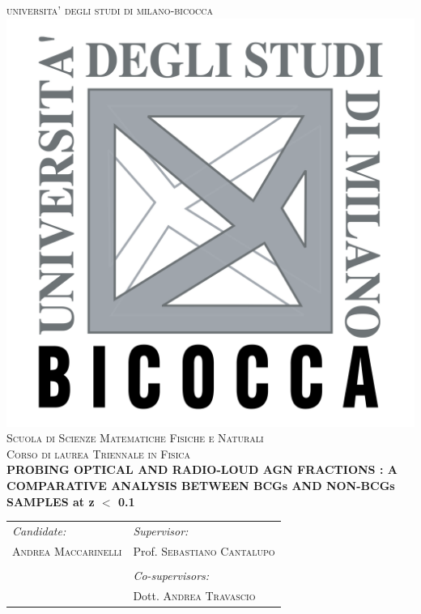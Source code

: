 \documentclass[a4]{article}
\newcommand{\HRule}{\rule{\linewidth}{0.5mm}} %
\begin{document}
\center %
 
{ 
\textsc{\LARGE universita' degli studi di milano-bicocca}\\[1cm] %
}
\includegraphics[width = .25\textwidth]{logo_unimib.png}\\[1cm] %
\textsc{ \large Scuola di Scienze Matematiche Fisiche e Naturali}\\[0.25cm]%
\textsc{\large Corso di laurea Triennale in Fisica}\\[0.75cm] %


\vspace{1.5cm}
{ 
{\bfseries PROBING OPTICAL AND RADIO-LOUD AGN FRACTIONS : A COMPARATIVE ANALYSIS BETWEEN BCGs AND NON-BCGs SAMPLES at z $<$ 0.1 }\\[0.4cm] %
}
\vspace{3cm}
 
\begin{table}[htb!]
\centering
\begin{tabularx}{\textwidth}{X X}
\emph{Candidate:} & \emph{Supervisor:} \\
\textsc{Andrea Maccarinelli} & Prof. \textsc{Sebastiano Cantalupo}  \\
& \\
& \emph{Co-supervisors:} \\
& Dott. \textsc{Andrea Travascio} \\
\end{tabularx}
\end{table}
\end{document}
